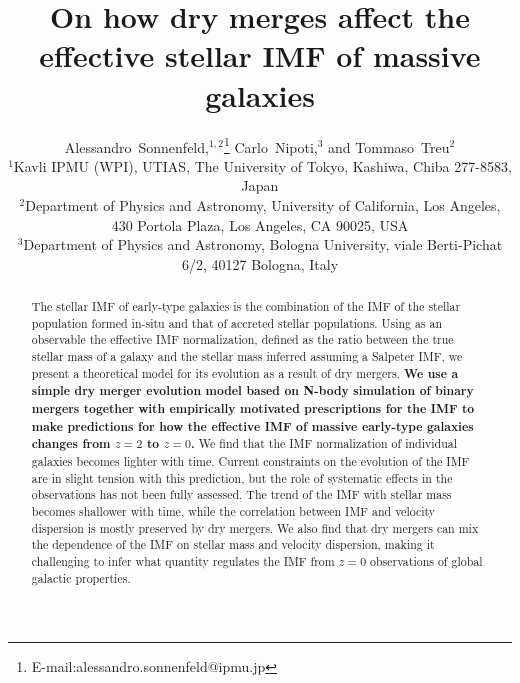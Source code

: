 \documentclass[usenatbib, letters]{mnras}
\begin{document}
\title{On how dry merges affect the effective stellar IMF of massive galaxies}
\author[Sonnenfeld et al.]{
Alessandro~Sonnenfeld,$^{1,2}$\thanks{E-mail:alessandro.sonnenfeld@ipmu.jp}
Carlo~Nipoti,$^{3}$
and Tommaso~Treu$^{2}$
\\
$^{1}$Kavli IPMU (WPI), UTIAS, The University of Tokyo, Kashiwa, Chiba 277-8583, Japan \\
$^{2}$Department of Physics and Astronomy, University of California, Los Angeles, 430 Portola Plaza, Los Angeles, CA 90025, USA \\
$^{3}$Department of Physics and Astronomy, Bologna University, viale Berti-Pichat 6/2, 40127 Bologna, Italy
}

\maketitle

\begin{abstract}
The stellar IMF of early-type galaxies is the combination of the IMF of the stellar population formed in-situ and that of accreted stellar populations.
Using as an observable the effective IMF normalization, defined as the ratio between the true stellar mass of a galaxy and the stellar mass inferred assuming a Salpeter IMF, we present a theoretical model for its evolution as a result of dry mergers.
{\bf We use a simple dry merger evolution model based on N-body simulation of binary mergers together with empirically motivated prescriptions for the IMF to make predictions for how the effective IMF of massive early-type galaxies changes from $z=2$ to $z=0$.}
We find that the IMF normalization of individual galaxies becomes lighter with time.
Current constraints on the evolution of the IMF are in slight tension with this prediction, but the role of systematic effects in the observations has not been fully assessed.
The trend of the IMF with stellar mass becomes shallower with time, while the correlation between IMF and velocity dispersion is mostly preserved by dry mergers.
We also find that dry mergers can mix the dependence of the IMF on stellar mass and velocity dispersion, making it challenging to infer what quantity regulates the IMF from $z=0$ observations of global galactic properties.
\end{abstract}
\end{document}
